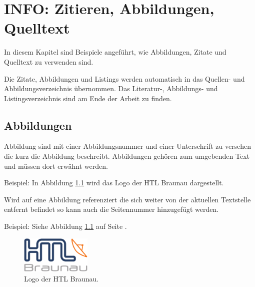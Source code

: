 


\chapter{INFO: Zitieren, Abbildungen, Quelltext}\label{ref:zitieren}

In diesem Kapitel sind Beispiele angeführt, wie Abbildungen, Zitate und Quelltext zu verwenden sind.

Die Zitate, Abbildungen und Listings werden automatisch in das Quellen- und Abbildungsverzeichnis übernommen. 
Das Literatur-, Abbildungs- und Listingsverzeichnis sind am Ende der Arbeit zu finden.   

\section{Abbildungen}\label{ref:abbildungen}

Abbildung sind mit einer Abbildungsnummer und einer Unterschrift zu versehen die kurz die Abbildung beschreibt. 
Abbildungen gehören zum umgebenden Text und müssen dort erwähnt werden.

Beispiel: In Abbildung \ref{htl01} wird das Logo der HTL Braunau dargestellt.

Wird auf eine Abbildung referenziert die sich weiter von der aktuellen Textstelle entfernt befindet so kann auch die Seitennummer hinzugefügt werden.

Beispiel: Siehe Abbildung \ref{htl01} auf Seite \pageref{htl01}.


\begin{figure}[H]
	\centering
	\includegraphics[width=0.3\textwidth]{./media/images/htl_c_cmyk_rein.pdf}
  	\caption{Logo der HTL Braunau.}
  	\label{htl01}
\end{figure}


